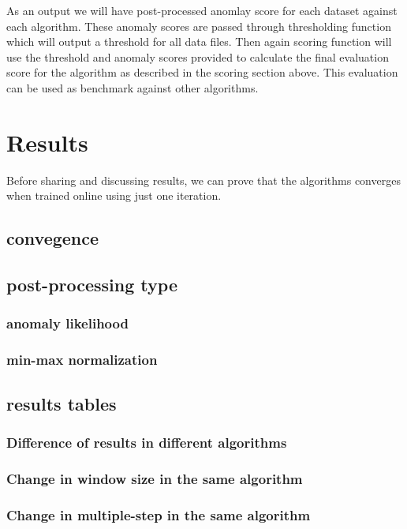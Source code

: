 \documentclass[12pt]{article}
\begin{document}
As an output we will have post-processed anomlay score for each dataset against each algorithm. These anomaly scores are passed through \cite{DBLP:journals/corr/LavinA15} thresholding function which will output a threshold for all data files. Then again \cite{DBLP:journals/corr/LavinA15} scoring function will use the threshold and anomaly scores provided to calculate the final evaluation score for the algorithm as described in the scoring section above. This evaluation can be used as benchmark against other algorithms.
\newpage
\section{Results}
Before sharing and discussing results, we can prove that the algorithms converges when trained online using just one iteration.
\subsection{convegence}
\subsection{post-processing type}
\subsubsection{anomaly likelihood}
\subsubsection{min-max normalization}
\subsection{results tables}
\subsubsection{Difference of results in different algorithms}
\subsubsection{Change in window size in the same algorithm}
\subsubsection{Change in multiple-step in the same algorithm}
\end{document}
